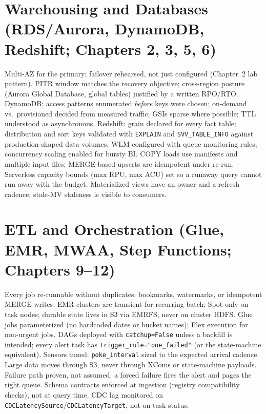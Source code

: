 \section{Warehousing and Databases (RDS/Aurora, DynamoDB, Redshift; Chapters 2, 3, 5, 6)}
%
\begin{itemize}
\chk Multi-AZ for the primary; failover rehearsed, not just configured (Chapter~2 lab pattern).
\chk PITR window matches the recovery objective; cross-region posture (Aurora Global Database,
global tables) justified by a written RPO/RTO.
\chk DynamoDB: access patterns enumerated \emph{before} keys were chosen; on-demand vs.\
provisioned decided from measured traffic; GSIs sparse where possible; TTL understood as
asynchronous.
\chk Redshift: grain declared for every fact table; distribution and sort keys validated with
\texttt{EXPLAIN} and \texttt{SVV\_TABLE\_INFO} against production-shaped data volumes.
\chk WLM configured with queue monitoring rules; concurrency scaling enabled for bursty BI.
\chk COPY loads use manifests and multiple input files; MERGE-based upserts are idempotent under
re-run.
\chk Serverless capacity bounds (max RPU, max ACU) set so a runaway query cannot run away with
the budget.
\chk Materialized views have an owner and a refresh cadence; stale-MV staleness is visible to
consumers.
\end{itemize}

\section{ETL and Orchestration (Glue, EMR, MWAA, Step Functions; Chapters 9--12)}
\index{checklist!ETL}%
\begin{itemize}
\chk Every job re-runnable without duplicates: bookmarks, watermarks, or idempotent MERGE writes.
\chk EMR clusters are transient for recurring batch; Spot only on task nodes; durable state lives
in S3 via EMRFS, never on cluster HDFS.
\chk Glue jobs parameterized (no hardcoded dates or bucket names); Flex execution for non-urgent
jobs.
\chk DAGs deployed with \texttt{catchup=False} unless a backfill is intended; every alert task has
\texttt{trigger\_rule="one\_failed"} (or the state-machine equivalent).
\chk Sensors tuned: \texttt{poke\_interval} sized to the expected arrival cadence.
\chk Large data moves through S3, never through XComs or state-machine payloads.
\chk Failure path proven, not assumed: a forced failure fires the alert and pages the right queue.
\chk Schema contracts enforced at ingestion (registry compatibility checks), not at query time.
\chk CDC lag monitored on \texttt{CDCLatencySource}/\texttt{CDCLatencyTarget}, not on task status.
\end{itemize}

